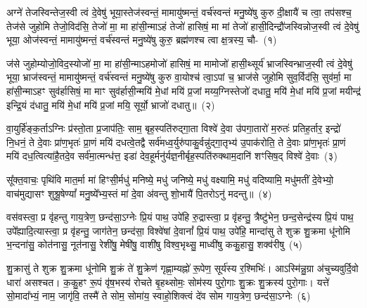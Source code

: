 \setcounter{anuvakam}{0}
अग्ने॑ तेजस्विन्तेज॒स्वी त्वं दे॒वेषु॑ भूया॒स्तेज॑स्वन्तं॒ मामायु॑ष्मन्तं॒ वर्च॑स्वन्तं मनु॒ष्ये॑षु कुरु दी॒क्षायै॑ च त्वा॒ तप॑सश्च॒ तेज॑से जुहोमि तेजो॒विद॑सि॒ तेजो॑ मा॒ मा हा॑सी॒न्मा\-ऽहं तेजो॑ हासिषं॒ मा मां तेजो॑ हासी॒दिन्द्रौ॑जस्विन्नोज॒स्वी त्वं दे॒वेषु॑ भूया॒ ओज॑स्वन्तं॒ मामायु॑ष्मन्तं॒ वर्च॑स्वन्तं मनु॒ष्ये॑षु कुरु॒ ब्रह्म॑णश्च त्वा क्ष॒त्रस्य॒ चौ-~(१)\ip

ज॑से जुहोम्योजो॒विद॒स्योजो॑ मा॒ मा हा॑सी॒न्मा\-ऽहमोजो॑ हासिषं॒ मा मामोजो॑ हासी॒थ्सूर्य॑ भ्राजस्विन्भ्राज॒स्वी त्वं दे॒वेषु॑ भूया॒ भ्राज॑स्वन्तं॒ मामायु॑ष्मन्तं॒ वर्च॑स्वन्तं मनु॒ष्ये॑षु कुरु वा॒योश्च॑ त्वा॒\-ऽपां च॒ भ्राज॑से जुहोमि सुव॒र्विद॑सि॒ सुव॑र्मा॒ मा हा॑सी॒न्मा\-ऽहꣳ सुव॑र्\mbox{}हासिषं॒ मा माꣳ सुव॑र्\mbox{}हासी॒न्मयि॑ मे॒धां मयि॑ प्र॒जां मय्य॒ग्निस्तेजो॑ दधातु॒ मयि॑ मे॒धां मयि॑ प्र॒जां मयीन्द्र॑ इन्द्रि॒यं द॑धातु॒ मयि॑ मे॒धां मयि॑ प्र॒जां मयि॒ सूर्यो॒ भ्राजो॑ दधातु॥~(२)\ip

{\anuvakamend[{क्ष॒त्रस्य॑ च॒ मयि॒ त्रयो॑विꣳशतिश्च}]}

वा॒युर्\mbox{}हि॑ङ्क॒र्ता\-ऽग्निः प्र॑स्तो॒ता प्र॒जा\-प॑तिः॒ साम॒ बृह॒स्पति॑रुद्गा॒ता विश्वे॑ दे॒वा उ॑पगा॒तारो॑ म॒रुतः॑ प्रतिह॒र्तार॒ इन्द्रो॑ नि॒धनं॒ ते दे॒वाः प्रा॑ण॒भृतः॑ प्रा॒णं मयि॑ दधत्वे॒तद्वै सर्व॑मध्व॒र्युरु॑पाकु॒र्वन्नु॑द्गा॒तृभ्य॑ उ॒पा\-क॑रोति॒ ते दे॒वाः प्रा॑ण॒भृतः॑ प्रा॒णं मयि॑ दध॒त्वित्या॑है॒तदे॒व सर्व॑मा॒त्मन्ध॑त्त॒ इडा॑ देव॒हूर्मनु॑र्यज्ञ॒नीर्बृह॒स्पति॑रुक्थाम॒दानि॑ शꣳसिष॒द् विश्वे॑ दे॒वाः~(३)\ip

सू᳚क्त॒वाचः॒ पृथि॑वि मात॒र्मा मा॑ हिꣳसी॒र्मधु॑ मनिष्ये॒ मधु॑ जनिष्ये॒ मधु॑ वक्ष्यामि॒ मधु॑ वदिष्यामि॒ मधु॑मतीं दे॒वेभ्यो॒ वाच॑मुद्यासꣳ शुश्रू॒षेण्यां᳚ मनु॒ष्ये᳚भ्य॒स्तं मा॑ दे॒वा अ॑वन्तु शो॒भायै॑ पि॒तरो\-ऽनु॑ मदन्तु॥~(४)\ip

{\anuvakamend[{श॒ꣳ॒सि॒ष॒द्विश्वे॑ दे॒वा अ॒ष्टाविꣳ॑शतिश्च}]}

वस॑वस्त्वा॒ प्र वृ॑हन्तु गाय॒त्रेण॒ छन्द॑सा॒\-ऽग्नेः प्रि॒यं पाथ॒ उपे॑हि रु॒द्रास्त्वा॒ प्र वृ॑हन्तु॒ त्रैष्टु॑भेन॒ छन्द॒सेन्द्र॑स्य प्रि॒यं पाथ॒ उपे᳚ह्यादि॒त्यास्त्वा॒ प्र वृ॑हन्तु॒ जाग॑तेन॒ छन्द॑सा॒ विश्वे॑षां दे॒वानां᳚ प्रि॒यं पाथ॒ उपे॑हि॒ मान्दा॑सु ते शुक्र शु॒क्रमा धू॑नोमि भ॒न्दना॑सु॒ कोत॑नासु॒ नूत॑नासु॒ रेशी॑षु॒ मेषी॑षु॒ वाशी॑षु विश्व॒भृथ्सु॒ माध्वी॑षु ककु॒हासु॒ शक्व॑रीषु~(५)\ip

शु॒क्रासु॑ ते शुक्र शु॒क्रमा धू॑नोमि शु॒क्रं ते॑ शु॒क्रेण॑ गृह्णा॒म्यह्नो॑ रू॒पेण॒ सूर्य॑स्य र॒श्मिभिः॑। आ\-ऽस्मि॑न्नु॒ग्रा अ॑चुच्यवुर्दि॒वो धारा॑ असश्चत। क॒कु॒हꣳ रू॒पं वृ॑ष॒भस्य॑ रोचते बृ॒हथ्सोमः॒ सोम॑स्य पुरो॒गाः शु॒क्रः शु॒क्रस्य॑ पुरो॒गाः। यत्ते॑ सो॒मादा᳚भ्यं॒ नाम॒ जागृ॑वि॒ तस्मै॑ ते सोम॒ सोमा॑य॒ स्वाहो॒शिक्त्वं दे॑व सोम गाय॒त्रेण॒ छन्द॑सा॒\-ऽग्नेः~(६)\ip

